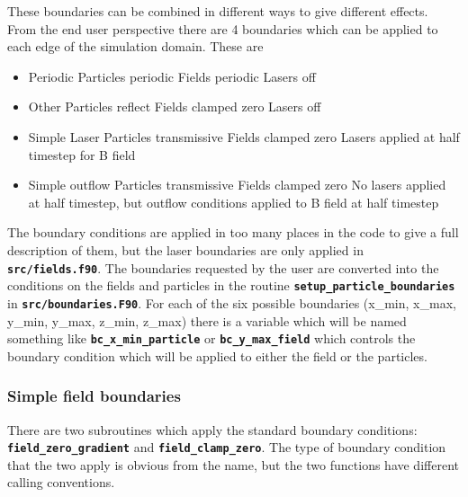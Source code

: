\documentclass[12pt,a4paper]{article}
\newcommand{\inlinecode}[1]{{\color{warwickred} \bf\texttt{#1}}}
\begin{document}
These boundaries can be combined in different ways to give different
effects. From the end user perspective there are 4 boundaries which can be
applied to each edge of the simulation domain. These are
\begin{itemize}
\item Periodic
  \subitem Particles periodic
  \subitem Fields periodic
  \subitem Lasers off
\item Other
  \subitem Particles reflect
  \subitem Fields clamped zero
  \subitem Lasers off
\item Simple Laser
  \subitem Particles transmissive
  \subitem Fields clamped zero
  \subitem Lasers applied at half timestep for B field
\item Simple outflow
  \subitem Particles transmissive
  \subitem Fields clamped zero
  \subitem No lasers applied at half timestep, but outflow conditions applied
  to B field at half timestep
\end{itemize}
The boundary conditions are applied in too many places in the code to give a
full description of them, but the laser boundaries are only applied in
\inlinecode{src/fields.f90}. The boundaries requested by the user are converted
into the conditions on the fields and particles in the routine
\inlinecode{setup\_particle\_boundaries} in
\inlinecode{src/boundaries.F90}. For each of the six possible boundaries
(x\_min, x\_max, y\_min, y\_max, z\_min, z\_max) there is a variable which will
be named something like \inlinecode{bc\_x\_min\_particle} or
\inlinecode{bc\_y\_max\_field} which controls the boundary condition which will
be applied to either the field or the particles.

\subsubsection{Simple field boundaries}
There are two subroutines which apply the standard boundary conditions:
\inlinecode{field\_zero\_gradient} and \inlinecode{field\_clamp\_zero}. The
type of boundary condition that the two apply is obvious from the name, but
the two functions have different calling conventions.
\end{document}
